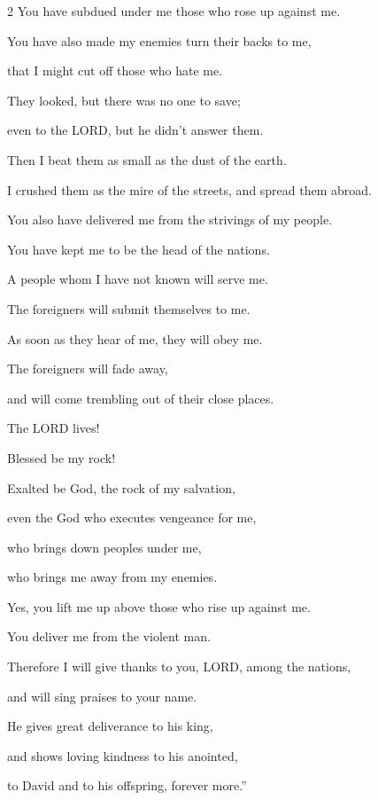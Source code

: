 \begin{multicols}{2}
You have subdued under me those who rose up against me.

\myverse{}You have also made my enemies turn their backs to me,

that I might cut off those who hate me.

\myverse{}They looked, but there was no one to save;

even to the LORD, but he didn’t answer them.

\myverse{}Then I beat them as small as the dust of the earth.

I crushed them as the mire of the streets, and spread them abroad.


\vspace{\baselineskip} 
\myverse{}You also have delivered me from the strivings of my people.

You have kept me to be the head of the nations.

A people whom I have not known will serve me.

\myverse{}The foreigners will submit themselves to me.

As soon as they hear of me, they will obey me.

\myverse{}The foreigners will fade away,

and will come trembling out of their close places.


\vspace{\baselineskip} 
\myverse{}The LORD lives!

Blessed be my rock!

Exalted be God, the rock of my salvation,

\myverse{}even the God who executes vengeance for me,

who brings down peoples under me,

\myverse{}who brings me away from my enemies.

Yes, you lift me up above those who rise up against me.

You deliver me from the violent man.

\myverse{}Therefore I will give thanks to you, LORD, among the nations,

and will sing praises to your name.

\myverse{}He gives great deliverance to his king,

and shows loving kindness to his anointed,

to David and to his offspring, forever more.”
\end{multicols}


